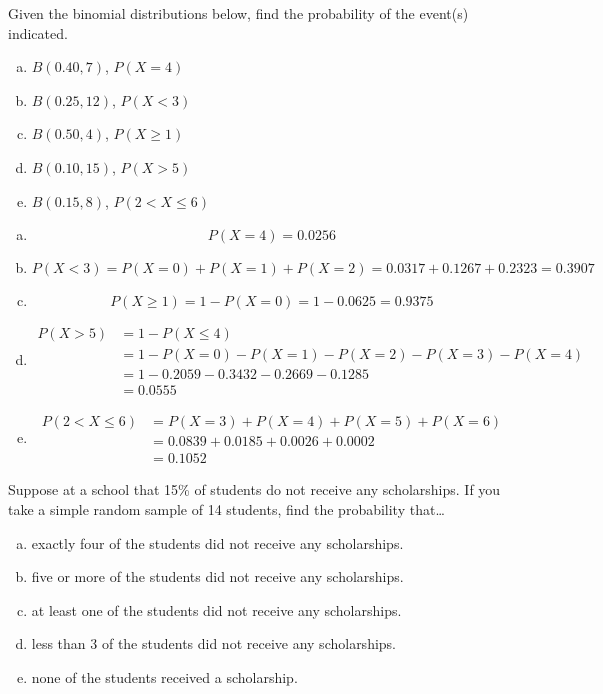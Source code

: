 \documentclass[11pt,letterpaper]{article}
\begin{document}

 Given the binomial distributions below, find the probability of the event(s) indicated. 
	\begin{enumerate}[(a)]
	\item $B(0.40, 7)$, $P(X= 4)$
	\item $B(0.25, 12)$, $P(X < 3)$
	\item $B(0.50, 4)$, $P(X \geq 1)$
	\item $B(0.10, 15)$, $P(X > 5)$
	\item $B(0.15, 8)$, $P(2 < X \leq 6)$
	\end{enumerate} \pspace

\sol 
\begin{enumerate}[(a)]
\item 
	\[
	P(X= 4)= 0.0256
	\]

\item 
	\[
	P(X < 3)= P(X= 0) + P(X= 1) + P(X= 2)= 0.0317 + 0.1267 + 0.2323= 0.3907
	\]

\item 
	\[
	P(X \geq 1)= 1 - P(X= 0)= 1 - 0.0625= 0.9375
	\]

\item 
	\[
	\begin{aligned}
	P(X > 5)&= 1 - P(X \leq 4) \\
	&= 1 - P(X= 0) - P(X= 1) - P(X= 2) - P(X= 3) - P(X= 4) \\
	&= 1 - 0.2059 - 0.3432 - 0.2669 - 0.1285 \\
	&= 0.0555
	\end{aligned}
	\]

\item 
	\[
	\begin{aligned}
	P(2 < X \leq 6)&= P(X= 3) + P(X= 4) + P(X= 5) + P(X= 6) \\
	&= 0.0839 + 0.0185 + 0.0026 + 0.0002 \\
	&= 0.1052
	\end{aligned}
	\]
\end{enumerate}


\newpage


 Suppose at a school that 15\% of students do not receive any scholarships. If you take a simple random sample of 14 students, find the probability that\dots
	\begin{enumerate}[(a)]
	\item exactly four of the students did not receive any scholarships. 
	\item five or more of the students did not receive any scholarships.
	\item at least one of the students did not receive any scholarships.
	\item less than 3 of the students did not receive any scholarships.
	\item none of the students received a scholarship. 
	\end{enumerate} \pspace
\end{document}
